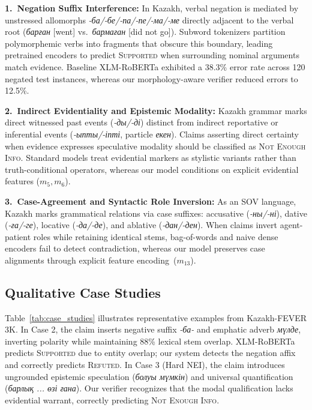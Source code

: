 \noindent\textbf{1.~Negation Suffix Interference:} In Kazakh, verbal negation is mediated by unstressed allomorphs \textit{-ба/-бе/-па/-пе/-ма/-ме} directly adjacent to the verbal root (\textit{барған} [went] vs.\ \textit{бармаған} [did not go]). Subword tokenizers partition polymorphemic verbs into fragments that obscure this boundary, leading pretrained encoders to predict \textsc{Supported} when surrounding nominal arguments match evidence. Baseline XLM-RoBERTa exhibited a 38.3\% error rate across 120 negated test instances, whereas our morphology-aware verifier reduced errors to 12.5\%.

\noindent\textbf{2.~Indirect Evidentiality and Epistemic Modality:} Kazakh grammar marks direct witnessed past events (\textit{-ды/-ді}) distinct from indirect reportative or inferential events (\textit{-ыпты/-іпті}, particle \textit{екен}). Claims asserting direct certainty when evidence expresses speculative modality should be classified as \textsc{Not Enough Info}. Standard models treat evidential markers as stylistic variants rather than truth-conditional operators, whereas our model conditions on explicit evidential features ($m_5, m_6$).

\noindent\textbf{3.~Case-Agreement and Syntactic Role Inversion:} As an SOV language, Kazakh marks grammatical relations via case suffixes: accusative (\textit{-ны/-ні}), dative (\textit{-ға/-ге}), locative (\textit{-да/-де}), and ablative (\textit{-дан/-ден}). When claims invert agent-patient roles while retaining identical stems, bag-of-words and naive dense encoders fail to detect contradiction, whereas our model preserves case alignments through explicit feature encoding~($m_{13}$).

\subsection{Qualitative Case Studies}
Table~\ref{tab:case_studies} illustrates representative examples from Kazakh-FEVER 3K. In Case 2, the claim inserts negative suffix \textit{-ба-} and emphatic adverb \textit{мүлде}, inverting polarity while maintaining 88\% lexical stem overlap. XLM-RoBERTa predicts \textsc{Supported} due to entity overlap; our system detects the negation affix and correctly predicts \textsc{Refuted}. In Case 3 (Hard NEI), the claim introduces ungrounded epistemic speculation (\textit{болуы мүмкін}) and universal quantification (\textit{барлық ... өзі ғана}). Our verifier recognizes that the modal qualification lacks evidential warrant, correctly predicting \textsc{Not Enough Info}.


